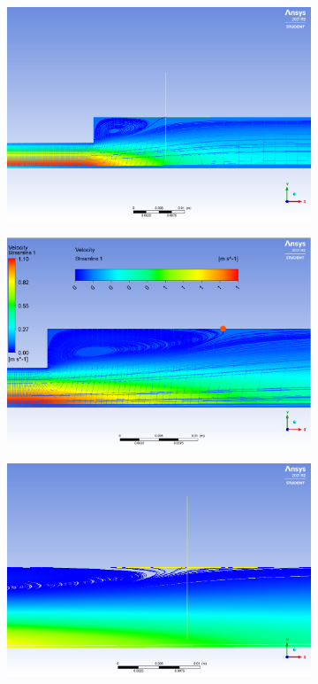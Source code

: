 \begin{figure}[H]
 \centering
\begin{subfigure}{.5\textwidth}
  \centering
  \includegraphics[width=.95\linewidth]{images/task1/030_attachement_0_0141.png}
  \subcaption{}
  \label{fig:reat_a}
\end{subfigure}%
\hfill
\begin{subfigure}{.5\textwidth}
  \centering
  \includegraphics[width=.95\linewidth]{images/task1/0554_attachement_0_0236.png}
  \subcaption{}
  \label{fig:reat_b}
\end{subfigure}
\hfill
\begin{subfigure}{.75\textwidth}
  \centering
  \includegraphics[width=.95\linewidth]{images/task1/100_attachement_0_430.png}

\end{subfigure}
\end{figure}
